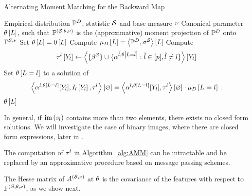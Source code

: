 \begin{algorithm}[h!]
    \caption{Alternating Moment Matching for the Backward Map}\label{alg:AMM}
    \begin{algorithmic}
        \Require Empirical distribution $\mathbb{P}^{D}$, statistic $\mathcal{S}$ and base measure $\nu$
        \Ensure Canonical parameter $\theta\left[L\right]$, such that $\mathbb{P}^{(\mathcal{S},\theta,\nu)}$ is the (approximative) moment projection of $\mathbb{P}^{D}$ onto $\Gamma^{\mathcal{S},\nu}$
        \iosepline
        \State Set $\theta\left[L\right]=0\left[L\right]$
        \State Compute $\mu_{D}\left[L\right]= \left\langle \mathbb{P}^{D},\sigma^{\mathcal{S}}\right\rangle \left[ L \right]$
            \ForAll{$\selindexin$}
                \State Compute
                \begin{align*}
                    \tau^{l}\left[Y_{l}\right]
                    \leftarrow \left\langle \{\beta^{\mathcal{S}}\}\cup\{\alpha^{\tilde{l},\theta\left[L=\tilde{l}\right]} : \tilde{l} \in [p], \tilde{l}\neq l\}\right\rangle \left[ Y_{l} \right]
                \end{align*}
                \State Set $\theta\left[L_{}=l_{}\right]$ to a solution of
                \begin{align*}
                    \left\langle \alpha^{l,\theta\left[L_{}=l_{}\right]}[Y_{l}],I_{l}\left[Y_{l}\right],\tau^{l}\right\rangle \left[ \varnothing \right]
                    = \left\langle \alpha^{l,\theta\left[L_{}=l_{}\right]}[Y_{l}],\tau^{l}\right\rangle \left[ \varnothing \right] \cdot \mu_{D}\left[L_{}=l_{}\right] \, .
                \end{align*}
            \EndFor
        \EndWhile
        \State \Return $\theta\left[L\right]$
    \end{algorithmic}
\end{algorithm}


% 
In general, if $\mathrm{im}\left(s_{l}\right)$ contains more than two elements, there exists no closed form solutions.
We will investigate the case of binary images, where there are closed form expressions, later in .

%
The computation of $\tau^{l}$ in Algorithm~\ref{alg:AMM} can be intractable and be replaced by an approximative procedure based on message passing schemes.


The Hesse matrix of $A^{(\mathcal{S},\nu)}$ at $\theta$ is the covariance of the features with respect to $\mathbb{P}^{(\mathcal{S},\theta,\nu)}$, as we show next.

